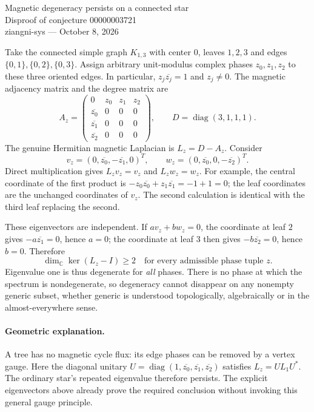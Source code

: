 \documentclass[11pt]{article}
\begin{document}
\begin{center}{\Large Magnetic degeneracy persists on a connected star}\\[4pt]
Disproof of conjecture 00000003721\\[4pt]
ziangni-sys --- October 8, 2026\end{center}

Take the connected simple graph $K_{1,3}$ with center $0$, leaves $1,2,3$
and edges $\{0,1\},\{0,2\},\{0,3\}$. Assign arbitrary unit-modulus complex
phases $z_0,z_1,z_2$ to these three oriented edges. In particular,
$z_j\overline{z_j}=1$ and $z_j\ne0$. The magnetic adjacency matrix and the
degree matrix are
\[
 A_z=\begin{pmatrix}
 0&z_0&z_1&z_2\\
 \overline{z_0}&0&0&0\\
 \overline{z_1}&0&0&0\\
 \overline{z_2}&0&0&0
 \end{pmatrix},\qquad D=\operatorname{diag}(3,1,1,1).
\]
The genuine Hermitian magnetic Laplacian is $L_z=D-A_z$. Consider
\[
 v_z=(0,\overline{z_0},-\overline{z_1},0)^T,
 \qquad
 w_z=(0,\overline{z_0},0,-\overline{z_2})^T.
\]
Direct multiplication gives $L_zv_z=v_z$ and $L_zw_z=w_z$. For example,
the central coordinate of the first product is
$-z_0\overline{z_0}+z_1\overline{z_1}=-1+1=0$; the leaf coordinates
are the unchanged coordinates of $v_z$. The second calculation is identical
with the third leaf replacing the second.

These eigenvectors are independent. If $av_z+bw_z=0$, the coordinate at
leaf $2$ gives $-a\overline{z_1}=0$, hence $a=0$; the coordinate at leaf
$3$ then gives $-b\overline{z_2}=0$, hence $b=0$. Therefore
\[
 \dim_{\mathbb C}\ker(L_z-I)\ge2
 \quad\text{for every admissible phase tuple }z.
\]
Eigenvalue one is thus degenerate for \emph{all} phases. There is no phase
at which the spectrum is nondegenerate, so degeneracy cannot disappear on
any nonempty generic subset, whether generic is understood topologically,
algebraically or in the almost-everywhere sense.

\paragraph{Geometric explanation.}
A tree has no magnetic cycle flux: its edge phases can be removed by a
vertex gauge. Here the diagonal unitary
$U=\operatorname{diag}(1,\overline{z_0},\overline{z_1},\overline{z_2})$
satisfies $L_z=UL_1U^*$. The ordinary star's repeated eigenvalue therefore
persists. The explicit eigenvectors above already prove the required
conclusion without invoking this general gauge principle.
\end{document}
